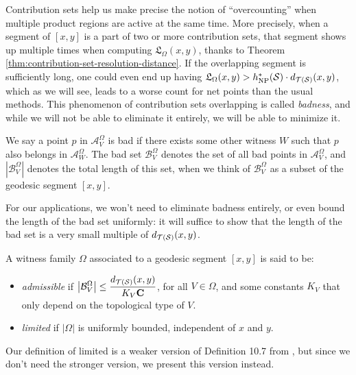 Contribution sets help us make precise the notion of ``overcounting'' when multiple product regions are active at the same time.
More precisely, when a segment of $[x,y]$ is a part of two or more contribution sets, that segment shows up multiple times when computing $\mathfrak{L}_{\Omega}(x,y)$, thanks to Theorem \ref{thm:contribution-set-resolution-distance}.
If the overlapping segment is sufficiently long, one could even end up having $\mathfrak{L}_{\Omega}(x,y) > h_{\mathrm{NP}}^\ast(\mathcal{S}) \cdot d_{\mathcal{T}(\mathcal{S})}(x, y)$, which as we will see, leads to a worse count for net points than the usual methods.
This phenomenon of contribution sets overlapping is called \emph{badness}, and while we will not be able to eliminate it entirely, we will be able to minimize it.

\begin{definition}
  We say a point $p$ in $\mathcal{A}_V^{\Omega}$ is bad if there exists some other witness $W$ such that $p$ also belongs in $\mathcal{A}_W^{\Omega}$.
  The bad set $\mathcal{B}_V^{\Omega}$ denotes the set of all bad points in $\mathcal{A}_V^{\Omega}$, and $\left| \mathcal{B}_V^{\Omega} \right|$ denotes the total length of this set, when we think of $\mathcal{B}_V^{\Omega}$ as a subset of the geodesic segment $[x,y]$.
\end{definition}

For our applications, we won't need to eliminate badness entirely, or even bound the length of the bad set uniformly: it will suffice to show that the length of the bad set is a very small multiple of $d_{\mathcal{T}(\mathcal{S})}(x,y)$.

\begin{definition}
  A witness family $\Omega$ associated to a geodesic segment $[x,y]$ is said to be:
  \begin{itemize}
  \item \emph{admissible} if $\displaystyle \left| \mathcal{B}_V^{\Omega} \right| \leq \frac{d_{\mathcal{T}(\mathcal{S})}(x,y)}{K_V \mathbf{C}}$, for all $V \in \Omega$, and some constants $K_V$ that only depend on the topological type of $V$.
  \item \emph{limited} if $\left| \Omega \right|$ is uniformly bounded, independent of $x$ and $y$.
  \end{itemize}
\end{definition}
\begin{remark}
  Our definition of limited is a weaker version of Definition 10.7 from \textcite{dowdall2023lattice}, but since we don't need the stronger version, we present this version instead.
\end{remark}

